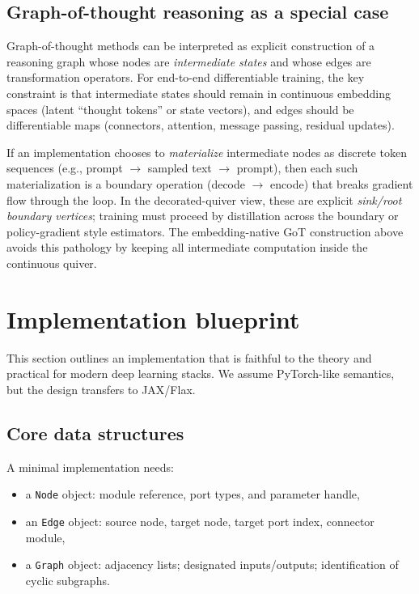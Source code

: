 \documentclass[11pt]{article}
\theoremstyle{definition}
\theoremstyle{plain}
\theoremstyle{remark}
\begin{document}
\subsection{Graph-of-thought reasoning as a special case}

Graph-of-thought methods can be interpreted as explicit construction of a reasoning graph whose nodes are \emph{intermediate states} and whose edges are transformation operators.
For end-to-end differentiable training, the key constraint is that intermediate states should remain in continuous embedding spaces (latent ``thought tokens'' or state vectors), and edges should be differentiable maps (connectors, attention, message passing, residual updates).

If an implementation chooses to \emph{materialize} intermediate nodes as discrete token sequences (e.g., prompt $\to$ sampled text $\to$ prompt), then each such materialization is a boundary operation (decode $\to$ encode) that breaks gradient flow through the loop.
In the decorated-quiver view, these are explicit \emph{sink/root boundary vertices}; training must proceed by distillation across the boundary or policy-gradient style estimators.
The embedding-native GoT construction above avoids this pathology by keeping all intermediate computation inside the continuous quiver.

\newpage

\section{Implementation blueprint}
\label{sec:implementation}

This section outlines an implementation that is faithful to the theory and practical for modern deep learning stacks.
We assume PyTorch-like semantics, but the design transfers to JAX/Flax.

\subsection{Core data structures}
A minimal implementation needs:
\begin{itemize}[leftmargin=2em]
\item a \texttt{Node} object: module reference, port types, and parameter handle,
\item an \texttt{Edge} object: source node, target node, target port index, connector module,
\item a \texttt{Graph} object: adjacency lists; designated inputs/outputs; identification of cyclic subgraphs.
\end{itemize}
\end{document}
